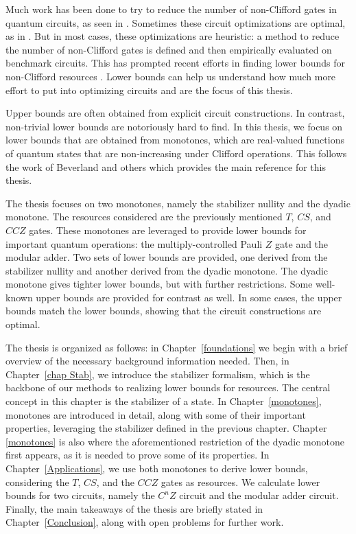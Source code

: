 \documentclass[12pt]{dalthesis}
\begin{document}
Much work has been done to try to reduce the number of non-Clifford gates in quantum circuits, as seen in \cite{ross2016optimal, selinger2014efficient, Amy_2019, glaudell2021optimal, haner2018optimizing, amy2021phasestate, gosset2013algorithm}. Sometimes these circuit optimizations are optimal, as in \cite{ross2016optimal, glaudell2021optimal, gosset2013algorithm}. But in most cases, these optimizations are heuristic: a method to reduce the number of non-Clifford gates is defined and then empirically evaluated on benchmark circuits. This has prompted recent efforts in finding lower bounds for non-Clifford resources \cite{beverland2019lower, Wang_2019, meuli2019role}. Lower bounds can help us understand how much more effort to put into optimizing circuits and are the focus of this thesis. 

Upper bounds are often obtained from explicit circuit constructions. In contrast, non-trivial lower bounds are notoriously hard to find. In this thesis, we focus on lower bounds that are obtained from monotones, which are real-valued functions of quantum states that are non-increasing under Clifford operations. This follows the work of Beverland and others \cite{beverland2019lower} which provides the main reference for this thesis. 

The thesis focuses on two monotones, namely the stabilizer nullity and the dyadic monotone. The resources considered are the previously mentioned $T$, $CS$, and $CCZ$ gates. These monotones are leveraged to provide lower bounds for important quantum operations: the multiply-controlled Pauli $Z$ gate and the modular adder. Two sets of lower bounds are provided, one derived from the stabilizer nullity and another derived from the dyadic monotone. The dyadic monotone gives tighter lower bounds, but with further restrictions. Some well-known upper bounds are provided for contrast as well. In some cases, the upper bounds match the lower bounds, showing that the circuit constructions are optimal. 

The thesis is organized as follows: in Chapter~\ref{foundations} we begin with a brief overview of the necessary background information needed. Then, in Chapter~\ref{chap Stab}, we introduce the stabilizer formalism, which is the backbone of our methods to realizing lower bounds for resources. The central concept in this chapter is the stabilizer of a state. In Chapter~\ref{monotones}, monotones are introduced in detail, along with some of their important properties, leveraging the stabilizer defined in the previous chapter. Chapter \ref{monotones} is also where the aforementioned restriction of the dyadic monotone first appears, as it is needed to prove some of its properties. In Chapter~\ref{Applications}, we use both monotones to derive lower bounds, considering the $T$, $CS$, and the $CCZ$ gates as resources. We calculate lower bounds for two circuits, namely the $C^nZ$ circuit and the modular adder circuit. Finally, the main takeaways of the thesis are briefly stated in Chapter~\ref{Conclusion}, along with open problems for further work.
\end{document}
